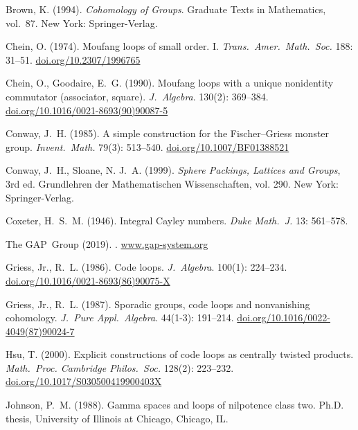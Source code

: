 \documentclass{article}
\theoremstyle{plain}
\theoremstyle{definition}
\begin{document}
\begin{thebibliography}{10}


Brown, K. (1994).
\newblock \emph{Cohomology of Groups}. Graduate Texts in  Mathematics, vol.~87.
\newblock New York: Springer-Verlag.

Chein, O. (1974).
\newblock Moufang loops of small order. {I}.
\newblock \emph{Trans.\ Amer.\ Math.\ Soc.} 188: 31--51.
\newblock \url{doi.org/10.2307/1996765}

Chein, O., Goodaire, E.~G. (1990).
\newblock Moufang loops with a unique nonidentity commutator (associator,
  square).
\newblock \emph{J.\ Algebra}. 130(2): 369--384.
\newblock \url{doi.org/10.1016/0021-8693(90)90087-5}

Conway, J.~H. (1985).
\newblock A simple construction for the {F}ischer--{G}riess monster group.
\newblock \emph{Invent.\ Math.} 79(3): 513--540.
\newblock \url{doi.org/10.1007/BF01388521}

Conway, J.~H., Sloane, N. J.~A. (1999).
\newblock \emph{Sphere Packings, Lattices and Groups}, 3rd ed. Grundlehren der Mathematischen Wissenschaften, vol. 290.
\newblock New York: Springer-Verlag.


Coxeter, H.\ S.\ M. (1946).
\newblock Integral Cayley numbers.
\newblock \emph{Duke Math.\ J.} 13: 561--578.

The GAP~Group (2019).
. 
\newblock \url{www.gap-system.org}

Griess, Jr., R.~L. (1986).
\newblock Code loops.
\newblock \emph{J.\ Algebra}. 100(1): 224--234.
\newblock \url{doi.org/10.1016/0021-8693(86)90075-X}

Griess, Jr., R.~L. (1987).
\newblock Sporadic groups, code loops and nonvanishing cohomology.
\newblock \emph{J.\ Pure Appl.\ Algebra}. 44(1-3): 191--214.
\newblock \url{doi.org/10.1016/0022-4049(87)90024-7}


Hsu, T. (2000).
\newblock Explicit constructions of code loops as centrally twisted products.
\newblock \emph{Math.\ Proc. Cambridge Philos.\ Soc.} 128(2): 223--232.
\newblock \url{doi.org/10.1017/S030500419900403X}

Johnson, P.~M. (1988).
\newblock Gamma spaces and loops of nilpotence class two.
\newblock Ph.D. thesis, University of Illinois at Chicago, Chicago, IL.



\end{thebibliography}
\end{document}
